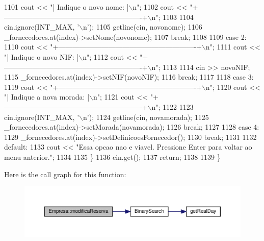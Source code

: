 \begin{DoxyCode}
1101         cout << \textcolor{stringliteral}{"| Indique o novo nome:                                     |\(\backslash\)n"};
1102         cout << \textcolor{stringliteral}{"+----------------------------------------------------------+\(\backslash\)n"};
1103 
1104         cin.ignore(INT\_MAX, \textcolor{charliteral}{'\(\backslash\)n'});
1105         getline(cin, novonome);
1106         \_fornecedores.at(index)->setNome(novonome);
1107         \textcolor{keywordflow}{break};
1108 
1109     \textcolor{keywordflow}{case} 2:
1110         cout << \textcolor{stringliteral}{"+----------------------------------------------------------+\(\backslash\)n"};
1111         cout << \textcolor{stringliteral}{"| Indique o novo NIF:                                      |\(\backslash\)n"};
1112         cout << \textcolor{stringliteral}{"+----------------------------------------------------------+\(\backslash\)n"};
1113 
1114         cin >> novoNIF;
1115         \_fornecedores.at(index)->setNIF(novoNIF);
1116         \textcolor{keywordflow}{break};
1117 
1118     \textcolor{keywordflow}{case} 3:
1119         cout << \textcolor{stringliteral}{"+----------------------------------------------------------+\(\backslash\)n"};
1120         cout << \textcolor{stringliteral}{"| Indique a nova morada:                                   |\(\backslash\)n"};
1121         cout << \textcolor{stringliteral}{"+----------------------------------------------------------+\(\backslash\)n"};
1122 
1123         cin.ignore(INT\_MAX, \textcolor{charliteral}{'\(\backslash\)n'});
1124         getline(cin, novamorada);
1125         \_fornecedores.at(index)->setMorada(novamorada);
1126         \textcolor{keywordflow}{break};
1127 
1128     \textcolor{keywordflow}{case} 4:
1129         \_fornecedores.at(index)->setDefinicoesFornecedor();
1130         \textcolor{keywordflow}{break};
1131 
1132     \textcolor{keywordflow}{default}:
1133         cout << \textcolor{stringliteral}{"Essa opcao nao e viavel. Pressione Enter para voltar ao menu anterior."};
1134 
1135     \}
1136     cin.get();
1137     \textcolor{keywordflow}{return};
1138 
1139 \}
\end{DoxyCode}


Here is the call graph for this function\+:\nopagebreak
\begin{figure}[H]
\begin{center}
\leavevmode
\includegraphics[width=350pt]{classEmpresa_ae74f80c120a14f0591d04fe7603e6905_cgraph}
\end{center}
\end{figure}


